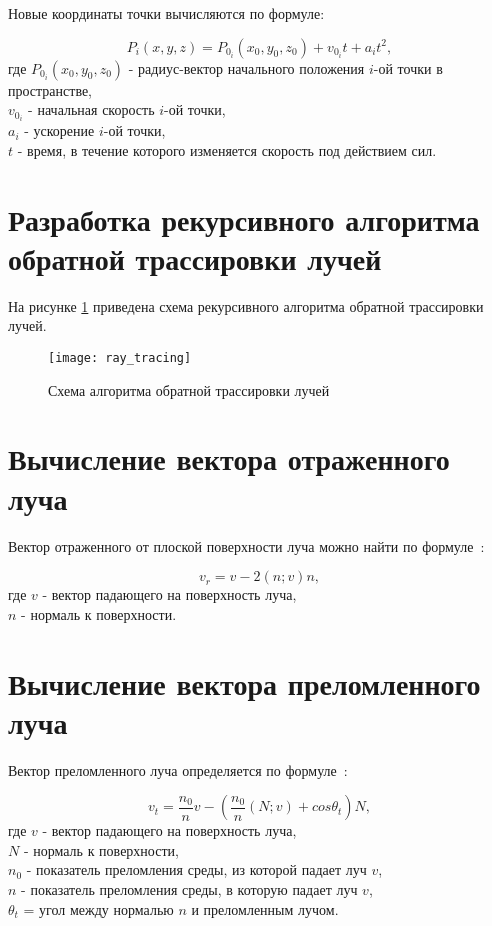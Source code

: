 Новые координаты точки вычисляются по формуле:

\begin{equation}\label{new_pos}
	P_i(x, y, z) = P_{0_i}(x_0, y_0, z_0) + v_{0_i} t + a_i t^2,
\end{equation}
где $P_{0_i}(x_0, y_0, z_0)$ - радиус-вектор начального положения $i$-ой точки в пространстве,\\
\text{~~~~~~}$v_{0_i}$ - начальная скорость $i$-ой точки,\\
\text{~~~~~~}$a_i$ - ускорение $i$-ой точки,\\
\text{~~~~~~}$t$ - время, в течение которого изменяется скорость под действием сил.

\section{Разработка рекурсивного алгоритма\\обратной трассировки лучей}

На рисунке \ref{ray_tracing} приведена схема рекурсивного алгоритма обратной трассировки лучей.

\begin{figure}[H]
	\centering
	\texttt{[image: ray\_tracing]}
	\caption{Схема алгоритма обратной трассировки лучей}
	\label{ray_tracing}
\end{figure}

\section{Вычисление вектора отраженного луча}

Вектор отраженного от плоской поверхности луча можно найти по формуле~\cite{raytracingen}:

\begin{equation}\label{refl}
	v_r = v - 2(n; v)n,
\end{equation}
где $v$ - вектор падающего на поверхность луча,\\
\text{~~~~~~}$n$ - нормаль к поверхности.

\section{Вычисление вектора преломленного луча}

Вектор преломленного луча определяется по формуле~\cite{raytracingen}:

\begin{equation}\label{refr}
	v_t = \frac{n_0}{n} v - (\frac{n_0}{n}(N; v) + cos\theta_t)N,
\end{equation}
где $v$ - вектор падающего на поверхность луча,\\
\text{~~~~~~}$N$ - нормаль к поверхности,\\
\text{~~~~~~}$n_0$ - показатель преломления среды, из которой падает луч $v$,\\
\text{~~~~~~}$n$ - показатель преломления среды, в которую падает луч $v$,\\
\text{~~~~~~}$\theta_t$ = угол между нормалью $n$ и преломленным лучом.

